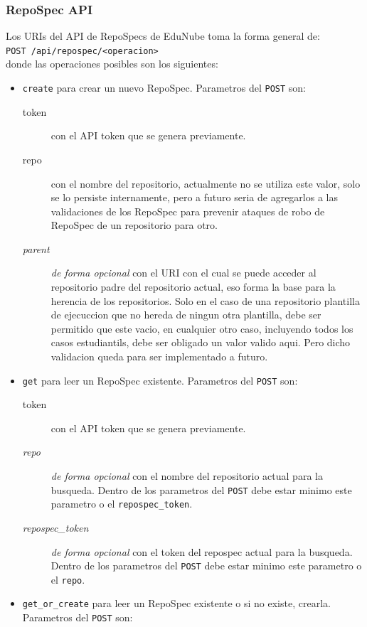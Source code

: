 \subsubsection{RepoSpec API}
Los URIs del API de RepoSpecs de EduNube toma la forma general de: \\
\texttt{POST /api/repospec/<operacion>} \\
donde las operaciones posibles son los siguientes:
\begin{itemize}
	\item \texttt{create} para crear un nuevo RepoSpec. Parametros del \texttt{POST} son:
    \begin{description}
    	\item[token] con el API token que se genera previamente.
        \item[repo] con el nombre del repositorio, actualmente no se utiliza este valor, solo se lo persiste internamente, pero a futuro seria de agregarlos a las validaciones de los RepoSpec para prevenir ataques de robo de RepoSpec de un repositorio para otro.
        \item[\textit{parent}] \textit{de forma opcional} con el URI con el cual se puede acceder al repositorio padre del repositorio actual, eso forma la base para la herencia de los repositorios. Solo en el caso de una repositorio plantilla de ejecuccion que no hereda de ningun otra plantilla, debe ser permitido que este vacio, en cualquier otro caso, incluyendo todos los casos estudiantils, debe ser obligado un valor valido aqui. Pero dicho validacion queda para ser implementado a futuro.
    \end{description}
    \item \texttt{get} para leer un RepoSpec existente. Parametros del \texttt{POST} son:
    \begin{description}
    	\item[token] con el API token que se genera previamente.
        \item[\textit{repo}] \textit{de forma opcional} con el nombre del repositorio actual para la busqueda. Dentro de los parametros del \texttt{POST} debe estar minimo este parametro o el \texttt{repospec\_token}.
        \item[\textit{repospec\_token}] \textit{de forma opcional} con el token del repospec actual para la busqueda. Dentro de los parametros del \texttt{POST} debe estar minimo este parametro o el \texttt{repo}.
    \end{description}
    \item \texttt{get\_or\_create} para leer un RepoSpec existente o si no existe, crearla. Parametros del \texttt{POST} son:

\end{itemize}
